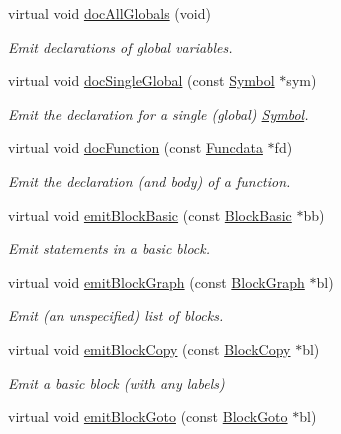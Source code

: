 \begin{DoxyCompactItemize}
virtual void \mbox{\hyperlink{class_print_c_a3ba75e33a923a30e5fe29b8201855749}{doc\+All\+Globals}} (void)
\begin{DoxyCompactList}\small\item\em Emit declarations of global variables. \end{DoxyCompactList}\item 
virtual void \mbox{\hyperlink{class_print_c_a380029e0d567ee29b38225d6f6612b9c}{doc\+Single\+Global}} (const \mbox{\hyperlink{class_symbol}{Symbol}} $\ast$sym)
\begin{DoxyCompactList}\small\item\em Emit the declaration for a single (global) \mbox{\hyperlink{class_symbol}{Symbol}}. \end{DoxyCompactList}\item 
virtual void \mbox{\hyperlink{class_print_c_a7a3890c28908f1229f8e94e0239fe0ea}{doc\+Function}} (const \mbox{\hyperlink{class_funcdata}{Funcdata}} $\ast$fd)
\begin{DoxyCompactList}\small\item\em Emit the declaration (and body) of a function. \end{DoxyCompactList}\item 
virtual void \mbox{\hyperlink{class_print_c_a41db7dd22ab2045a63adb7cd5ad1cfdb}{emit\+Block\+Basic}} (const \mbox{\hyperlink{class_block_basic}{Block\+Basic}} $\ast$bb)
\begin{DoxyCompactList}\small\item\em Emit statements in a basic block. \end{DoxyCompactList}\item 
virtual void \mbox{\hyperlink{class_print_c_a44433ba4a36eb79bf55d717b209d0a86}{emit\+Block\+Graph}} (const \mbox{\hyperlink{class_block_graph}{Block\+Graph}} $\ast$bl)
\begin{DoxyCompactList}\small\item\em Emit (an unspecified) list of blocks. \end{DoxyCompactList}\item 
virtual void \mbox{\hyperlink{class_print_c_a63589b8489cd26e45c2d01a76554999b}{emit\+Block\+Copy}} (const \mbox{\hyperlink{class_block_copy}{Block\+Copy}} $\ast$bl)
\begin{DoxyCompactList}\small\item\em Emit a basic block (with any labels) \end{DoxyCompactList}\item 
virtual void \mbox{\hyperlink{class_print_c_aa63448aa07e17951dd81712dac58e6d9}{emit\+Block\+Goto}} (const \mbox{\hyperlink{class_block_goto}{Block\+Goto}} $\ast$bl)

\end{DoxyCompactItemize}
